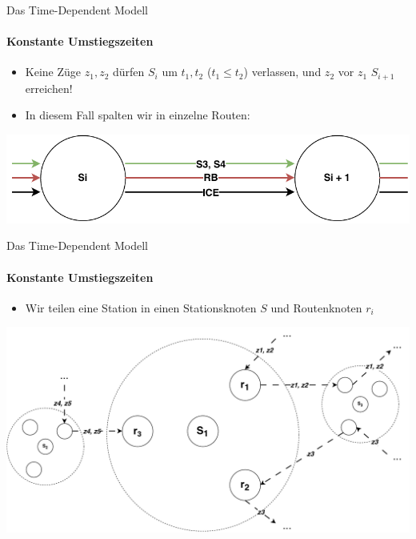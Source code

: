 \begin{frame}{Das Time-Dependent Modell}
	\framesubtitle{Konstante Umstiegszeiten}
	\begin{itemize}
		\item Keine Züge $z_1,z_2$ dürfen $S_i$ um $t_1,t_2$ ($t_1 \leq t_2$) verlassen, und $z_2$ vor $z_1$ $S_{i + 1}$ erreichen!
		\item In diesem Fall spalten wir in einzelne Routen:
	\end{itemize}
	
	\begin{center}
		\includegraphics[width=\linewidth]{images/time-dependent/zugroute-loesung.pdf}
	\end{center}
\end{frame}


\begin{frame}{Das Time-Dependent Modell}
	\framesubtitle{Konstante Umstiegszeiten}
	\begin{itemize}
		\item Wir teilen eine Station in einen Stationsknoten $S$ und Routenknoten $r_i$
	\end{itemize}
	
	\begin{center}
		\includegraphics[width=.90\linewidth]{images/time-dependent/model_0.pdf}
	\end{center}
\end{frame}


